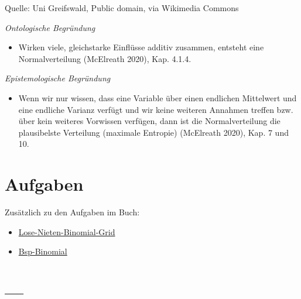 \documentclass[
  a4paper,
  DIV=11]{scrreprt}
\providecommand{\tightlist}{%
  \setlength{\itemsep}{0pt}\setlength{\parskip}{0pt}}\usepackage{longtable,booktabs,array}
\theoremstyle{definition}
\theoremstyle{remark}
\begin{document}
Quelle: Uni Greifswald, Public domain, via Wikimedia Commons

\begin{tcolorbox}[enhanced jigsaw, leftrule=.75mm, left=2mm, bottomrule=.15mm, opacityback=0, coltitle=black, colbacktitle=quarto-callout-note-color!10!white, opacitybacktitle=0.6, rightrule=.15mm, toptitle=1mm, colback=white, colframe=quarto-callout-note-color-frame, arc=.35mm, toprule=.15mm, breakable, titlerule=0mm, bottomtitle=1mm, title=\textcolor{quarto-callout-note-color}{\faInfo}\hspace{0.5em}{Hinweis}]

\emph{Ontologische Begründung}

\begin{itemize}
\tightlist
\item
  Wirken viele, gleichstarke Einflüsse additiv zusammen, entsteht eine
  Normalverteilung (McElreath 2020), Kap. 4.1.4.
\end{itemize}

\emph{Epistemologische Begründung}

\begin{itemize}
\tightlist
\item
  Wenn wir nur wissen, dass eine Variable über einen endlichen
  Mittelwert und eine endliche Varianz verfügt und wir keine weiteren
  Annahmen treffen bzw. über kein weiteres Vorwissen verfügen, dann ist
  die Normalverteilung die plausibelste Verteilung (maximale Entropie)
  (McElreath 2020), Kap. 7 und 10.
\end{itemize}

\end{tcolorbox}

\hypertarget{aufgaben-2}{%
\section{Aufgaben}\label{aufgaben-2}}

Zusätzlich zu den Aufgaben im Buch:

\begin{itemize}
\tightlist
\item
  \href{https://datenwerk.netlify.app/posts/lose-nieten-binomial-grid/lose-nieten-binomial-grid}{Lose-Nieten-Binomial-Grid}
\item
  \href{https://datenwerk.netlify.app/posts/bsp-binomial/bsp-binomial}{Bsp-Binomial}
\end{itemize}

\hypertarget{section-3}{%
\section{---}\label{section-3}}
\end{document}
